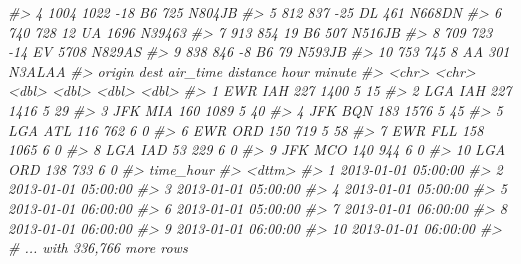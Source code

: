 \documentclass[
]{book}
\newenvironment{Shaded}{\begin{snugshade}}{\end{snugshade}}
\newcommand{\CommentTok}[1]{\textcolor[rgb]{0.56,0.35,0.01}{\textit{#1}}}
\begin{document}
\begin{Shaded}
\begin{Highlighting}[]
\CommentTok{\#\textgreater{}  4     1004           1022       {-}18 B6         725 N804JB }
\CommentTok{\#\textgreater{}  5      812            837       {-}25 DL         461 N668DN }
\CommentTok{\#\textgreater{}  6      740            728        12 UA        1696 N39463 }
\CommentTok{\#\textgreater{}  7      913            854        19 B6         507 N516JB }
\CommentTok{\#\textgreater{}  8      709            723       {-}14 EV        5708 N829AS }
\CommentTok{\#\textgreater{}  9      838            846        {-}8 B6          79 N593JB }
\CommentTok{\#\textgreater{} 10      753            745         8 AA         301 N3ALAA }
\CommentTok{\#\textgreater{}    origin dest  air\_time distance  hour minute}
\CommentTok{\#\textgreater{}    \textless{}chr\textgreater{}  \textless{}chr\textgreater{}    \textless{}dbl\textgreater{}    \textless{}dbl\textgreater{} \textless{}dbl\textgreater{}  \textless{}dbl\textgreater{}}
\CommentTok{\#\textgreater{}  1 EWR    IAH        227     1400     5     15}
\CommentTok{\#\textgreater{}  2 LGA    IAH        227     1416     5     29}
\CommentTok{\#\textgreater{}  3 JFK    MIA        160     1089     5     40}
\CommentTok{\#\textgreater{}  4 JFK    BQN        183     1576     5     45}
\CommentTok{\#\textgreater{}  5 LGA    ATL        116      762     6      0}
\CommentTok{\#\textgreater{}  6 EWR    ORD        150      719     5     58}
\CommentTok{\#\textgreater{}  7 EWR    FLL        158     1065     6      0}
\CommentTok{\#\textgreater{}  8 LGA    IAD         53      229     6      0}
\CommentTok{\#\textgreater{}  9 JFK    MCO        140      944     6      0}
\CommentTok{\#\textgreater{} 10 LGA    ORD        138      733     6      0}
\CommentTok{\#\textgreater{}    time\_hour          }
\CommentTok{\#\textgreater{}    \textless{}dttm\textgreater{}             }
\CommentTok{\#\textgreater{}  1 2013{-}01{-}01 05:00:00}
\CommentTok{\#\textgreater{}  2 2013{-}01{-}01 05:00:00}
\CommentTok{\#\textgreater{}  3 2013{-}01{-}01 05:00:00}
\CommentTok{\#\textgreater{}  4 2013{-}01{-}01 05:00:00}
\CommentTok{\#\textgreater{}  5 2013{-}01{-}01 06:00:00}
\CommentTok{\#\textgreater{}  6 2013{-}01{-}01 05:00:00}
\CommentTok{\#\textgreater{}  7 2013{-}01{-}01 06:00:00}
\CommentTok{\#\textgreater{}  8 2013{-}01{-}01 06:00:00}
\CommentTok{\#\textgreater{}  9 2013{-}01{-}01 06:00:00}
\CommentTok{\#\textgreater{} 10 2013{-}01{-}01 06:00:00}
\CommentTok{\#\textgreater{} \# ... with 336,766 more rows}
\end{Highlighting}
\end{Shaded}
\end{document}
